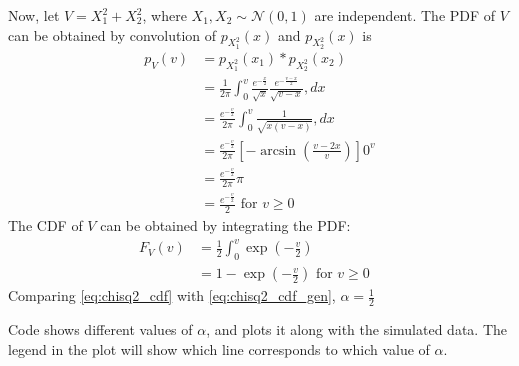\documentclass[12pt]{book}
\providecommand{\gauss}[2]{\mathcal{N}\ensuremath{\left(#1,#2\right)}}
\begin{document}
\begin{enumerate}
Now, let $V = X_1^2 + X_2^2$, where $X_1, X_2 \sim \gauss{0}{1}$ are independent. The PDF of $V$ can be obtained by convolution of $p_{X_1^2}(x)$ and $p_{X_2^2}(x)$ is
\begin{align*}
p_V(v) &= p_{X_1^2}(x_1) * p_{X_2^2}(x_2)\\
&= \frac{1}{2\pi} \int_{0}^{v} \frac{e^{-\frac{x}{2}}}{\sqrt{x}}\frac{e^{-\frac{v-x}{2}}}{\sqrt{v-x}} ,dx\\
&= \frac{e^{-\frac{v}{2}}}{2\pi} \int_{0}^{v} \frac{1}{\sqrt{x(v-x)}} ,dx\\
&= \frac{e^{-\frac{v}{2}}}{2\pi} [-\arcsin\left(\frac{v-2x}{v}\right)]0^v\\
&= \frac{e^{-\frac{v}{2}}}{2\pi} \pi\\
&= \frac{e^{-\frac{v}{2}}}{2} \text{ for } v \ge 0
\end{align*}
The CDF of $V$ can be obtained by integrating the PDF:
\begin{align}
	\nonumber
	F_V(v) &= \frac{1}{2} \int_{0}^{v} \exp\left(-\frac{v}{2}\right)&\\
	\label{eq:chisq2_cdf}
	&= 1-\exp\left(-\frac{v}{2}\right) \text{ for } v \ge 0
\end{align}
Comparing \eqref{eq:chisq2_cdf} with \eqref{eq:chisq2_cdf_gen}, $\alpha = \frac{1}{2}$ \\
\begin{center}
\end{center}
 Code shows different values of $\alpha$, and plots it along with the simulated data. The legend in the plot will show which line corresponds to which value of $\alpha$.


\end{enumerate}
\end{document}
